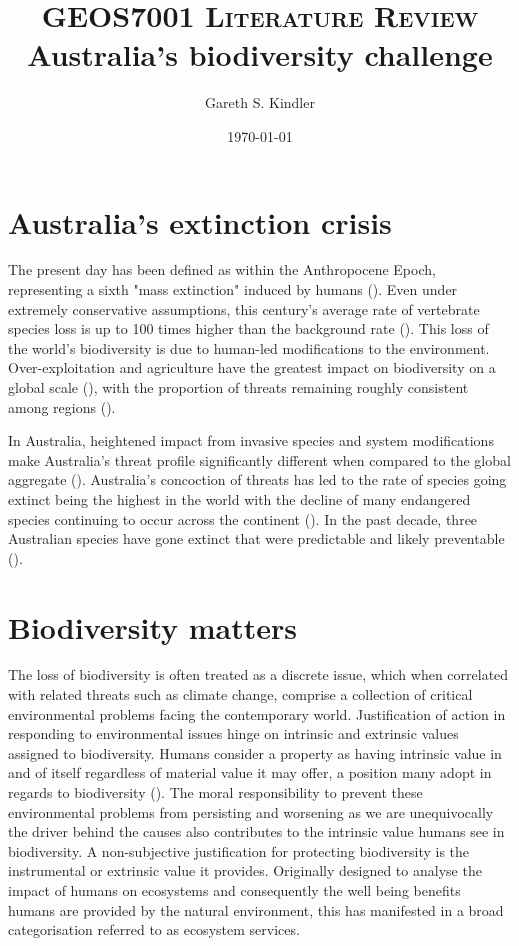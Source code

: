 \documentclass[paper=a4, fontsize=12pt]{article}
\title{
\textsc{GEOS7001 Literature Review} \\
\huge  Australia's biodiversity challenge
}
\author{Gareth S. Kindler}
\date{\normalsize\today}
\begin{document}
\maketitle

\newpage
\tableofcontents

\newpage
\section{Australia's extinction crisis}
The present day has been defined as within the Anthropocene Epoch, representing a sixth "mass extinction" induced by humans (\cite{lewis_defining_2015}). Even under extremely conservative assumptions, this century's average rate of vertebrate species loss is up to 100 times higher than the background rate (\cite{ceballos_accelerated_2015}). This loss of the world's biodiversity is due to human-led modifications to the environment. Over-exploitation and agriculture have the greatest impact on biodiversity on a global scale (\cite{maxwell_biodiversity_2016}), with the proportion of threats remaining roughly consistent among regions (\cite{w_w_f_living_2020}).

In Australia, heightened impact from invasive species and system modifications make Australia's threat profile significantly different when compared to the global aggregate (\cite{kearney_threats_2019}). Australia's concoction of threats has led to the rate of species going extinct being the highest in the world with the decline of many endangered species continuing to occur across the continent (\cite{simmonds_vulnerable_2020}). In the past decade, three Australian species have gone extinct that were predictable and likely preventable (\cite{woinarski_contribution_2017}).

\section{Biodiversity matters}
The loss of biodiversity is often treated as a discrete issue, which when correlated with related threats such as climate change, comprise a collection of critical environmental problems facing the contemporary world. Justification of action in responding to environmental issues hinge on intrinsic and extrinsic values assigned to biodiversity. Humans consider a property as having intrinsic value in and of itself regardless of material value it may offer, a position many adopt in regards to biodiversity (\cite{morton_biodiversity_2014}). The moral responsibility to prevent these environmental problems from persisting and worsening as we are unequivocally the driver behind the causes also contributes to the intrinsic value humans see in biodiversity. A non-subjective justification for protecting biodiversity is the instrumental or extrinsic value it provides. Originally designed to analyse the impact of humans on ecosystems and consequently the well being benefits humans are provided by the natural environment, this has manifested in a broad categorisation referred to as ecosystem services. 
\end{document}
